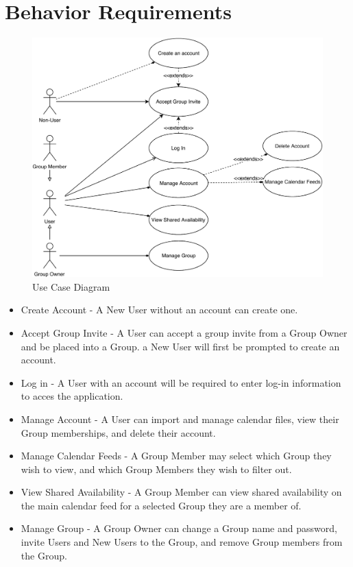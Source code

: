\documentclass{scrreprt}
\begin{document}
\section{Behavior Requirements}

\begin{figure}[ht]
    \centering
    \includegraphics[width=1\textwidth]{CalendarProjectUseCases}
    \caption{Use Case Diagram}
    \label{fig:use-case}
\end{figure}

\begin{itemize}
\item Create Account - A New User without an account can create one.
\item Accept Group Invite - A User can accept a group invite from a Group Owner and be placed into a Group.
a New User will first be prompted to create an account.
\item Log in - A User with an account will be required to enter log-in information to acces the application.
\item Manage Account - A User can import and manage calendar files, view their Group memberships, and delete
their account.
\item Manage Calendar Feeds - A Group Member may select which Group they wish to view, and which Group
Members they wish to filter out.
\item View Shared Availability - A Group Member can view shared availability on the main calendar feed for a
selected Group they are a member of.
\item Manage Group - A Group Owner can change a Group name and password, invite Users and New Users to the
Group, and remove Group members from the Group.
\end{itemize}
\end{document}
